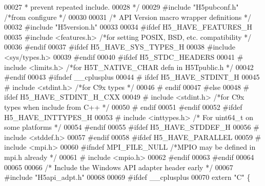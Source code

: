 \begin{DoxyCode}
00027 \textcolor{comment}{ * prevent repeated include.}
00028 \textcolor{comment}{ */}
00029 \textcolor{preprocessor}{#include "H5pubconf.h"}      \textcolor{comment}{/*from configure                             */}
00030 
00031 \textcolor{comment}{/* API Version macro wrapper definitions */}
00032 \textcolor{preprocessor}{#include "H5version.h"}
00033 
00034 \textcolor{preprocessor}{#ifdef H5\_HAVE\_FEATURES\_H}
00035 \textcolor{preprocessor}{#include <features.h>}           \textcolor{comment}{/*for setting POSIX, BSD, etc. compatibility */}
00036 \textcolor{preprocessor}{#endif}
00037 \textcolor{preprocessor}{#ifdef H5\_HAVE\_SYS\_TYPES\_H}
00038 \textcolor{preprocessor}{#include <sys/types.h>}
00039 \textcolor{preprocessor}{#endif}
00040 \textcolor{preprocessor}{#ifdef H5\_STDC\_HEADERS}
00041 \textcolor{preprocessor}{#   include <limits.h>}      \textcolor{comment}{/*for H5T\_NATIVE\_CHAR defn in H5Tpublic.h    */}
00042 \textcolor{preprocessor}{#endif}
00043 \textcolor{preprocessor}{#ifndef \_\_cplusplus}
00044 \textcolor{preprocessor}{# ifdef H5\_HAVE\_STDINT\_H}
00045 \textcolor{preprocessor}{#   include <stdint.h>}      \textcolor{comment}{/*for C9x types                  */}
00046 \textcolor{preprocessor}{# endif}
00047 \textcolor{preprocessor}{#else}
00048 \textcolor{preprocessor}{# ifdef H5\_HAVE\_STDINT\_H\_CXX}
00049 \textcolor{preprocessor}{#   include <stdint.h>}      \textcolor{comment}{/*for C9x types when include from C++        */}
00050 \textcolor{preprocessor}{# endif}
00051 \textcolor{preprocessor}{#endif}
00052 \textcolor{preprocessor}{#ifdef H5\_HAVE\_INTTYPES\_H}
00053 \textcolor{preprocessor}{#   include <inttypes.h>}        \textcolor{comment}{/* For uint64\_t on some platforms            */}
00054 \textcolor{preprocessor}{#endif}
00055 \textcolor{preprocessor}{#ifdef H5\_HAVE\_STDDEF\_H}
00056 \textcolor{preprocessor}{#   include <stddef.h>}
00057 \textcolor{preprocessor}{#endif}
00058 \textcolor{preprocessor}{#ifdef H5\_HAVE\_PARALLEL}
00059 \textcolor{preprocessor}{#   include <mpi.h>}
00060 \textcolor{preprocessor}{#ifndef MPI\_FILE\_NULL       }\textcolor{comment}{/*MPIO may be defined in mpi.h already       */}\textcolor{preprocessor}{}
00061 \textcolor{preprocessor}{#   include <mpio.h>}
00062 \textcolor{preprocessor}{#endif}
00063 \textcolor{preprocessor}{#endif}
00064 
00065 
00066 \textcolor{comment}{/* Include the Windows API adapter header early */}
00067 \textcolor{preprocessor}{#include "H5api\_adpt.h"}
00068 
00069 \textcolor{preprocessor}{#ifdef \_\_cplusplus}
00070 \textcolor{keyword}{extern} \textcolor{stringliteral}{"C"} \{

\end{DoxyCode}
